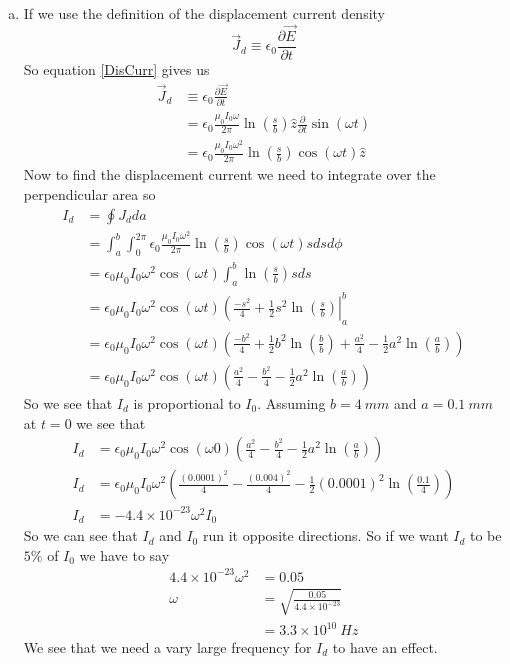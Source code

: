 \documentclass[11pt]{article}
\numberwithin{equation}{section}
\begin{document}
\begin{enumerate}[(a)]
\item
If we use the definition of the displacement current density 
\begin{equation}
\vec{J}_d\equiv\epsilon_0\frac{\partial \vec{E}}{\partial t}
\label{DisCurr}
\end{equation}
So equation \ref{DisCurr} gives us
\begin{align*}
\vec{J}_d&\equiv\epsilon_0\frac{\partial \vec{E}}{\partial t}\\
&= \epsilon_0\frac{\mu_0 I_0\omega}{2\pi}\ln\left(\frac{s}{b}\right)\hat{z}\frac{\partial}{\partial t}\sin(\omega t)\\
&= \epsilon_0\frac{\mu_0 I_0\omega^2}{2\pi}\ln\left(\frac{s}{b}\right)\cos(\omega t)\hat{z}
\end{align*}
Now to find the displacement current we need to integrate over the perpendicular area so
\begin{align*}
I_d &= \oint J_dda\\
 &= \int_a^b\int_0^{2\pi}\epsilon_0\frac{\mu_0 I_0\omega^2}{2\pi}\ln\left(\frac{s}{b}\right)\cos(\omega t)sdsd\phi\\
 &= \epsilon_0\mu_0 I_0\omega^2\cos(\omega t)\int_a^b\ln\left(\frac{s}{b}\right)sds\\
 &= \epsilon_0\mu_0 I_0\omega^2\cos(\omega t)\left(\frac{-s^2}{4}+\frac{1}{2}s^2\ln\left(\frac{s}{b}\right)\right|_a^b\\
 &= \epsilon_0\mu_0 I_0\omega^2\cos(\omega t)\left(\frac{-b^2}{4}+\frac{1}{2}b^2\ln\left(\frac{b}{b}\right) + \frac{a^2}{4}-\frac{1}{2}a^2\ln\left(\frac{a}{b}\right)\right)\\
 &= \epsilon_0\mu_0 I_0\omega^2\cos(\omega t)\left(\frac{a^2}{4} - \frac{b^2}{4} - \frac{1}{2}a^2\ln\left(\frac{a}{b}\right)\right)
\end{align*}
So we see that $I_d$ is proportional to $I_0$. Assuming $b=4\ mm$ and $a= 0.1\ mm$ at $t=0$ we see that
\begin{align*}
I_d &= \epsilon_0\mu_0 I_0\omega^2\cos(\omega 0)\left(\frac{a^2}{4} - \frac{b^2}{4} - \frac{1}{2}a^2\ln\left(\frac{a}{b}\right)\right)\\
I_d &= \epsilon_0\mu_0 I_0\omega^2\left(\frac{(0.0001)^2}{4} - \frac{(0.004)^2}{4} - \frac{1}{2}(0.0001)^2\ln\left(\frac{0.1}{4}\right)\right)\\
I_d &= -4.4\times10^{-23}\omega^2I_0
\end{align*}
So we can see that $I_d$ and $I_0$ run it opposite directions. So if we want $I_d$ to be $5\%$ of $I_0$ we have to say
\begin{align*}
4.4\times10^{-23}\omega^2 &= 0.05\\
\omega &= \sqrt{\frac{0.05}{4.4\times10^{-23}}}\\
&= 3.3\times10^{10}\ Hz
\end{align*}
We see that we need a vary large frequency for $I_d$ to have an effect.
\end{enumerate}
\end{document}
